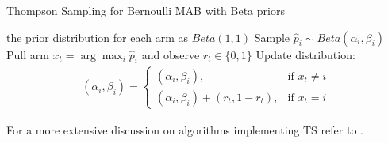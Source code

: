 \begin{algorithm}[t]
	\caption{Thompson Sampling for Bernoulli MAB with Beta priors}
	\label{alg:bernoulliTS}
	\begin{algorithmic}[1]
	 the prior distribution for each arm as $Beta(1,1)$
			\State Sample $\hat{p}_i\sim Beta(\alpha_i,\beta_i)$
		\EndFor
		\State Pull arm $x_t=\arg\max_i\hat{p}_i$ and observe $r_t\in\{0,1\}$
		\State Update distribution:
		\begin{align}
			(\alpha_i,\beta_i) = \begin{cases}(\alpha_i,\beta_i), &\text{if }x_t\neq i \\ (\alpha_i,\beta_i) + (r_t,1-r_t), &\text{if } x_t= i\end{cases}
		\end{align}
	\EndFor
	\end{algorithmic}
\end{algorithm}

For a more extensive discussion on algorithms implementing \gls{TS}  refer to \cite{russo2018tutorial}.
\\


